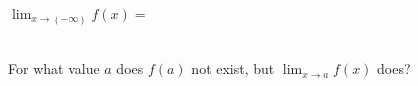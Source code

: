 \documentclass[11pt]{exam}
\begin{document}
\begin{questions}

\label{graph-limit-start}
  
\question[1]
  $\displaystyle{\lim_{x \to (-\infty)} f(x)}=$ \\ \\
   \vspace*{.15in}

\question[1]
  For what value $a$ does $f(a)$ not exist, but $\displaystyle{\lim_{x \to a} f(x)}$ does?
   \vspace*{.15in}

\label{graph-limit-end}

\end{questions}




\UCblankpage

\blankpage
\end{document}
